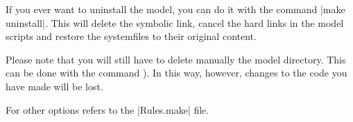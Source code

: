 If you ever want to uninstall the model, you can do it with the command
|make uninstall|. This will delete the symbolic link, cancel the hard
links in the model scripts and restore the systemfiles \ttt{\sysfiles}
to their original content.

Please note that you will still have to delete manually the model
directory. This can be done with the command ). In
this way, however, changes to the code you have made will be lost.

For other options refers to the |Rules.make| file.
